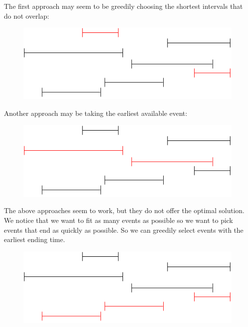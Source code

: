 \documentclass[11pt,oneside]{book}
\makeatletter
\def\maxwidth#1{\ifdim\Gin@nat@width>#1 #1\else\Gin@nat@width\fi}
\makeatother
\begin{document}
The first approach may seem to be greedily choosing the shortest intervals that do not overlap:

\vspace{5px}\begin{figure}[H]\centering
        \includegraphics[width=0.66\maxwidth{\textwidth}]{intervalschedule2.png}
        \end{figure}

Another approach may be taking the earliest available event:

\vspace{5px}\begin{figure}[H]\centering
        \includegraphics[width=0.66\maxwidth{\textwidth}]{intervalschedule3.png}
        \end{figure}

The above approaches seem to work, but they do not offer the optimal solution.  We notice that we want to fit as many events as possible so we want to pick events that end as quickly as possible. So we can greedily select events with the earliest ending time.

\vspace{5px}\begin{figure}[H]\centering
        \includegraphics[width=0.66\maxwidth{\textwidth}]{intervalschedule4.png}
        \end{figure}
\end{document}
